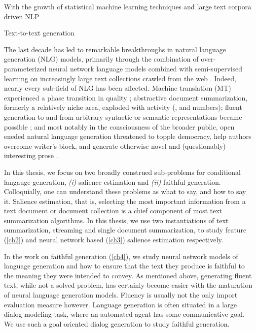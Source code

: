 With the growth of statistical machine learning techniques and large 
text corpora
driven NLP 

Text-to-text generation 




The last decade has led to remarkable breakthroughs in natural language
generation (NLG) models, primarily through the combination of over-parameterized 
neural network language models \cite{sutskever2014sequence,bahdanau2014neural,vaswani2017attention} combined
with semi-supervised learning on increasingly large text collections
crawled from the web \cite{radford2019language,lewis2019bart}. Indeed, nearly every sub-field of NLG has been 
affected. Machine translation (MT) experienced a phase transition in quality
\cite{wu2016google}; abstractive document summarization, formerly a relatively 
niche area, exploded with activity (\cite{}, and numbers); fluent generation
to and from arbitrary syntactic or semantic representations became possible
\cite{vinyals2015grammar,konstas2017neural,novikova2017e2e,gardent2017webnlg,mille-etal-2018-first}; and most notably in
the consciousness of the broader public, open eneded natural language
generation threatened to topple democracy, help authors overcome 
writer's block, and generate otherwise novel and (questionably) interesting
prose \cite{radford2019language}.


In this thesis, we focus on two broadly construed sub-problems for 
conditional langauge generation, \textit{(i)} salience estimation and 
\textit{(ii)} faithful generation.
Colloquially, one can understand these problems as what to say, and how 
to say it. Salience estimation, that is, selecting the most important
information from a text document or document collection is a chief
component of most text summarization algorithms. In this thesis, we 
use two instantiations of text summarization, streaming and single document
summarization, to study feature (\autoref{ch2}) and neural
network based (\autoref{ch3}) salience estimation respectively. 

In the work on faithful generation (\autoref{ch4}), 
we study neural network models of language
generation and how to ensure that the text they produce is faithful
to the meaning they were intended to convey. As mentioned above, generating
fluent text, while not a solved problem, has certainly become easier
with the maturation of neural language generation models. Fluency is usually
not the only import evaluation measure however. Language generation is often situated in a 
large dialog modeling task, where an automated agent has some communicative 
goal. We use such a goal oriented dialog generation to study faithful 
generation.

